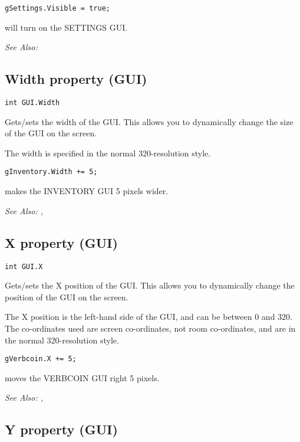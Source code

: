 \begin{verbatim}
gSettings.Visible = true;
\end{verbatim}
will turn on the SETTINGS GUI.

\it{See Also:} 


\subsection{Width property (GUI)}\label{GUI.Width}%

\begin{verbatim}
int GUI.Width
\end{verbatim}
Gets/sets the width of the GUI. This allows you to dynamically change the size
of the GUI on the screen.

The width is specified in the normal 320-resolution style.

\begin{verbatim}
gInventory.Width += 5;
\end{verbatim}

makes the INVENTORY GUI 5 pixels wider.

\it{See Also:} , 


\subsection{X property (GUI)}\label{GUI.X}%

\begin{verbatim}
int GUI.X
\end{verbatim}
Gets/sets the X position of the GUI. This allows you to dynamically change the position
of the GUI on the screen.

The X position is the left-hand side of the GUI, and can be between 0 and 320. The
co-ordinates used are screen co-ordinates, not room co-ordinates, and are in the normal
320-resolution style.

\begin{verbatim}
gVerbcoin.X += 5;
\end{verbatim}

moves the VERBCOIN GUI right 5 pixels.

\it{See Also:} , 


\subsection{Y property (GUI)}\label{GUI.Y}%

